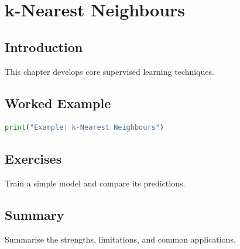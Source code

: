 \chapter{k-Nearest Neighbours}
\label{chap:vol6-10}



\section{Introduction}
This chapter develops core supervised learning techniques.

\section{Worked Example}
\begin{lstlisting}[language=Python]
print("Example: k-Nearest Neighbours")
\end{lstlisting}

\section{Exercises}
\begin{exercise}
Train a simple model and compare its predictions.
\end{exercise}

\section{Summary}
Summarise the strengths, limitations, and common applications.
